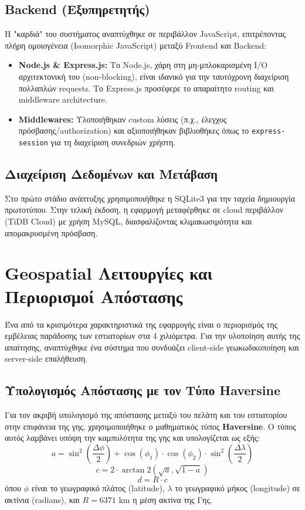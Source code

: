 \documentclass[acmsmall,screen,nonacm]{acmart}
\begin{document}
	\subsection{Backend (Εξυπηρετητής)}
	Η "καρδιά" του συστήματος αναπτύχθηκε σε περιβάλλον JavaScript, επιτρέποντας πλήρη ομοιογένεια (Isomorphic JavaScript) μεταξύ Frontend και Backend:
	\begin{itemize}
		\item \textbf{Node.js \& Express.js:} Το Node.js, χάρη στη μη-μπλοκαρισμένη I/O αρχιτεκτονική του (non-blocking), είναι ιδανικό για την ταυτόχρονη διαχείριση πολλαπλών requests. Το Express.js προσέφερε το απαραίτητο routing και middleware architecture.
		\item \textbf{Middlewares:} Υλοποιήθηκαν custom λύσεις (π.χ., έλεγχος πρόσβασης/authorization) και αξιοποιήθηκαν βιβλιοθήκες όπως το \texttt{express-session} για τη διαχείριση συνεδριών χρήστη.
	\end{itemize}
	
	\subsection{Διαχείριση Δεδομένων και Μετάβαση}
	Στο πρώτο στάδιο ανάπτυξης χρησιμοποιήθηκε η SQLite3 για την ταχεία δημιουργία πρωτοτύπου. Στην τελική έκδοση, η εφαρμογή μεταφέρθηκε σε cloud περιβάλλον (TiDB Cloud) με χρήση MySQL, διασφαλίζοντας κλιμακωσιμότητα και απομακρυσμένη πρόσβαση.
	
	\section{Geospatial Λειτουργίες και Περιορισμοί Απόστασης}
	Ένα από τα κρισιμότερα χαρακτηριστικά της εφαρμογής είναι ο περιορισμός της εμβέλειας παράδοσης των εστιατορίων στα 4 χιλιόμετρα. Για την υλοποίηση αυτής της απαίτησης, αναπτύχθηκε ένα σύστημα που συνδυάζει client-side γεωκωδικοποίηση και server-side επαλήθευση.

	\subsection{Υπολογισμός Απόστασης με τον Τύπο Haversine}
	Για τον ακριβή υπολογισμό της απόστασης μεταξύ του πελάτη και του εστιατορίου στην επιφάνεια της γης, χρησιμοποιήθηκε ο μαθηματικός τύπος \textbf{Haversine}. Ο τύπος αυτός λαμβάνει υπόψη την καμπυλότητα της γης και υπολογίζεται ως εξής:
	\begin{equation}
		a = \sin^2\left(\frac{\Delta\phi}{2}\right) + \cos(\phi_1) \cdot \cos(\phi_2) \cdot \sin^2\left(\frac{\Delta\lambda}{2}\right)
	\end{equation}
	\begin{equation}
		c = 2 \cdot \arctan2(\sqrt{a}, \sqrt{1-a})
	\end{equation}
	\begin{equation}
		d = R \cdot c
	\end{equation}
	όπου $\phi$ είναι το γεωγραφικό πλάτος (latitude), $\lambda$ το γεωγραφικό μήκος (longitude) σε ακτίνια (radians), και $R = 6371 \text{ km}$ η μέση ακτίνα της Γης.
\end{document}
